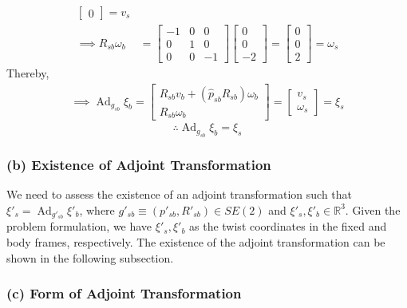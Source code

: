 \begin{align*}
\begin{bmatrix}
        0
    \end{bmatrix}
    =
    v_s
    \\
    \implies
    R_{s b} \omega_b
     & =
    \begin{bmatrix}
        -1 & 0 & 0  \\
        0  & 1 & 0  \\
        0  & 0 & -1
    \end{bmatrix}
    \begin{bmatrix}
        0 \\
        0 \\
        -2
    \end{bmatrix}
    =
    \begin{bmatrix}
        0 \\
        0 \\
        2
    \end{bmatrix}
    =
    \omega_s
\end{align*}
Thereby,
\begin{align*}
    \implies
    \operatorname{Ad}_{g_{s b}} \xi_{b}
    =
    \begin{bmatrix}
        R_{s b} v_b + (\widehat{p}_{s b} R_{s b}) \omega_b \\
        R_{s b} \omega_b
    \end{bmatrix}
    =
    \begin{bmatrix}
        v_s \\
        \omega_s
    \end{bmatrix}
    =
    \xi_s
\end{align*}
\begin{equation*}
    \therefore
    \boxed{
    \operatorname{Ad}_{g_{s b}} \xi_{b}
    =
    \xi_s
    }
\end{equation*}

\subsubsection*{(b) Existence of Adjoint Transformation}

We need to assess the existence of an adjoint transformation such that \( \xi'_s = \operatorname{Ad}_{g'_{s b}} \xi'_b \), where \( g'_{s b} \equiv (p'_{s b}, R'_{s b}) \in SE(2) \) and \( \xi'_s, \xi'_b \in \mathbb{R}^3 \).
Given the problem formulation, we have \( \xi'_s, \xi'_b \) as the twist coordinates in the fixed and body frames, respectively.
The existence of the adjoint transformation can be shown in the following subsection.

\subsubsection*{(c) Form of Adjoint Transformation}

